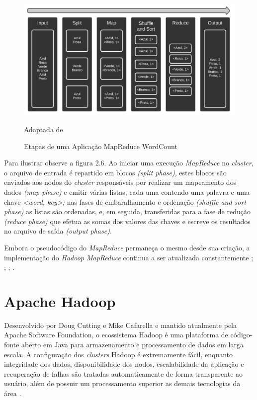 \begin{figure}[htp]
    \centering
    \includegraphics[width=16cm]{2-fundam/Figura_7.jpg}
    \caption{Etapas de uma Aplicação MapReduce WordCount}
    Adaptada de \cite{white2015hadoop}
    \label{fig:Etapas de uma Aplicação MapReduce WordCount}
\end{figure}

Para ilustrar observe a figura 2.6. Ao iniciar uma execução \emph{MapReduce} no \emph{cluster}, o arquivo de entrada é repartido em blocos \emph{(split phase)}, estes blocos são enviados aos nodos do \emph{cluster} responsáveis por realizar um mapeamento dos dados \emph{(map phase)} e emitir várias listas, cada uma contendo uma palavra e uma chave \emph{<word, key>;} nas fases de embaralhamento e ordenação \emph{(shuffle and sort phase)} as listas são ordenadas, e, em seguida, transferidas para a fase de redução \emph{(reduce phase)} que efetua as somas dos valores das chaves e escreve os resultados no arquivo de saída \emph{(output phase)}.

Embora o pseudocódigo do \emph{MapReduce} permaneça o mesmo desde sua criação, a implementação do \emph{Hadoop MapReduce} continua a ser atualizada constantemente \cite{white2009hadoop}; \cite{white2010hadoop}; \cite{white2012hadoop}; \cite{white2015hadoop}.


\section{Apache Hadoop}

Desenvolvido por Doug Cutting e Mike Cafarella e mantido atualmente pela Apache Software Foundation, o ecossistema Hadoop é uma plataforma de código-fonte aberto em Java para armazenamento e processamento de dados em larga escala. A configuração dos \emph{clusters} Hadoop é extremamente fácil, enquanto integridade dos dados, disponibilidade dos nodos, escalabilidade da aplicação e recuperação de falhas são tratadas automaticamente de forma transparente ao usuário, além de possuir um processamento superior as demais tecnologias da área \cite{goldman2012apache}.

